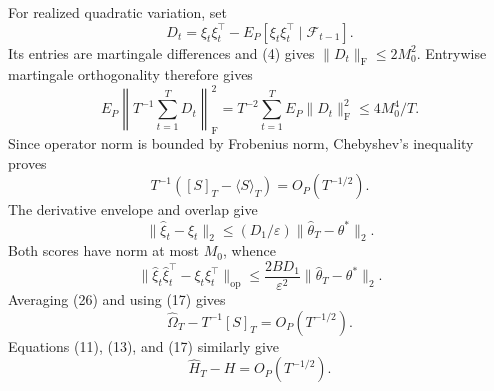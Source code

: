 For realized quadratic variation, set
\[
 D_t=\xi_t\xi_t^\top-E_P[\xi_t\xi_t^\top\mid\mathcal F_{t-1}].
\tag{22}
\]
Its entries are martingale differences and (4) gives \(\|D_t\|_{\mathrm F}\le2M_0^2\). Entrywise martingale orthogonality therefore gives
\[
 E_P\left\|T^{-1}\sum_{t=1}^TD_t\right\|_{\mathrm F}^2
 =T^{-2}\sum_{t=1}^TE_P\|D_t\|_{\mathrm F}^2
 \le4M_0^4/T.
\tag{23}
\]
Since operator norm is bounded by Frobenius norm, Chebyshev's inequality proves
\[
 T^{-1}([S]_T-\langle S\rangle_T)=O_P(T^{-1/2}).
\tag{24}
\]
The derivative envelope and overlap give
\[
 \|\widehat\xi_t-\xi_t\|_2
 \le(D_1/\varepsilon)\|\widehat\theta_T-\theta^*\|_2.
\tag{25}
\]
Both scores have norm at most \(M_0\), whence
\[
 \|\widehat\xi_t\widehat\xi_t^\top-\xi_t\xi_t^\top\|_{\mathrm{op}}
 \le\frac{2BD_1}{\varepsilon^2}\|\widehat\theta_T-\theta^*\|_2.
\tag{26}
\]
Averaging (26) and using (17) gives
\[
 \widehat\Omega_T-T^{-1}[S]_T=O_P(T^{-1/2}).
\tag{27}
\]
Equations (11), (13), and (17) similarly give
\[
 \widehat H_T-H=O_P(T^{-1/2}).
\tag{28}
\]

